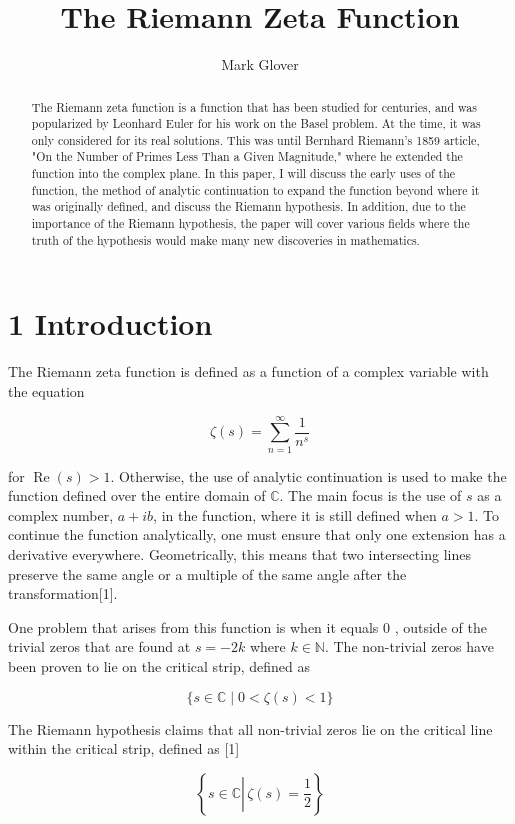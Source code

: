 \documentclass[10pt]{article}
\title{The Riemann Zeta Function }
\author{Mark Glover}
\date{}
\begin{document}
\maketitle

\begin{abstract}
The Riemann zeta function is a function that has been studied for centuries, and was popularized by Leonhard Euler for his work on the Basel problem. At the time, it was only considered for its real solutions. This was until Bernhard Riemann's 1859 article, "On the Number of Primes Less Than a Given Magnitude," where he extended the function into the complex plane. In this paper, I will discuss the early uses of the function, the method of analytic continuation to expand the function beyond where it was originally defined, and discuss the Riemann hypothesis. In addition, due to the importance of the Riemann hypothesis, the paper will cover various fields where the truth of the hypothesis would make many new discoveries in mathematics.
\end{abstract}

\section*{1 Introduction}
The Riemann zeta function is defined as a function of a complex variable with the equation

$$
\zeta(s)=\sum_{n=1}^{\infty} \frac{1}{n^{s}}
$$

for $\operatorname{Re}(s)>1$. Otherwise, the use of analytic continuation is used to make the function defined over the entire domain of $\mathbb{C}$. The main focus is the use of $s$ as a complex number, $a+i b$, in the function, where it is still defined when $a>1$. To continue the function analytically, one must ensure that only one extension has a derivative everywhere. Geometrically, this means that two intersecting lines preserve the same angle or a multiple of the same angle after the transformation[1].

One problem that arises from this function is when it equals 0 , outside of the trivial zeros that are found at $s=-2 k$ where $k \in \mathbb{N}$. The non-trivial zeros have been proven to lie on the critical strip, defined as

$$
\{s \in \mathbb{C} \mid 0<\zeta(s)<1\}
$$

The Riemann hypothesis claims that all non-trivial zeros lie on the critical line within the critical strip, defined as [1]

$$
\left\{s \in \mathbb{C} \left\lvert\, \zeta(s)=\frac{1}{2}\right.\right\}
$$
\end{document}
